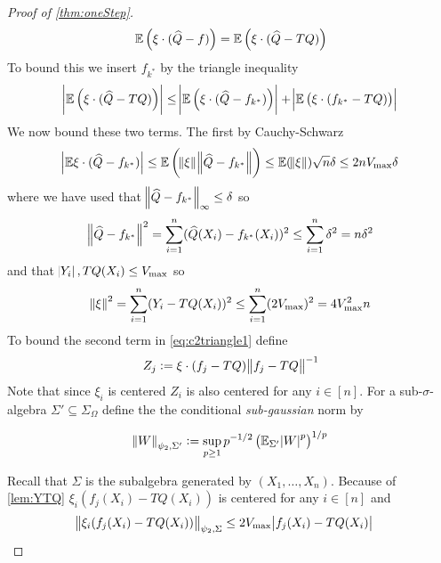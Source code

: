 \begin{proof}[Proof of \cref{thm:oneStep}]
  \begin{equation}
    \mathbb{E} \left( \xi \cdot (\widehat{Q} - f) \right)
    = \mathbb{E} \left( \xi \cdot (\widehat{Q} - TQ) \right)
  \end{equation}
  To bound this we insert $f_{k^*}$ by the triangle inequality
  \begin{equation}
    \abs{\mathbb{E} \left( \xi \cdot (\widehat{Q} - TQ) \right) }
    \leq \abs{\mathbb{E} \left( \xi \cdot (\widehat{Q} - f_{k^*}) \right) } 
    + \abs{\mathbb{E} \left( \xi \cdot (f_{k^*} - TQ) \right) }
    \label{eq:c2triangle1}
  \end{equation}
  We now bound these two terms. The first by Cauchy-Schwarz
  \begin{equation}
    \abs{\mathbb{E} \xi \cdot (\widehat{Q} - f_{k^*})}
    \leq \mathbb{E} \left( \norm{\xi} \norm{\widehat{Q} - f_{k^*}} \right)
    \leq \mathbb{E} (\norm{\xi}) \sqrt{n} \delta
    \leq 2 n V_{\max} \delta
    \label{eq:c2firstcs}
  \end{equation}
  where we have used that $\norm{\widehat{Q} - f_{k^*}}_\infty \leq \delta$ so
  \begin{equation}
    \norm{\widehat{Q} - f_{k^*}}^2
    = \sum_{i=1}^n (\widehat{Q}(X_i) - f_{k^*}(X_i))^2
    \leq \sum_{i=1}^n \delta^2
    = n \delta^2
  \end{equation}
  and that $\abs{Y_i}, TQ(X_i) \leq V_{\max}$ so
  \begin{equation}
    \norm{\xi}^2 = \sum_{i=1}^n (Y_i - TQ(X_i))^2 
    \leq \sum_{i=1}^n (2 V_{\max})^2
    = 4 V_{\max}^2 n
  \end{equation}
  To bound the second term in \cref{eq:c2triangle1} define
  \begin{equation}
  Z_j := \xi \cdot (f_j - TQ) \norm{f_j - TQ}^{-1}
  \end{equation}
  Note that since $\xi_i$ is centered $Z_i$ is also centered for any
  $i \in [n]$.
  For a sub-$\sigma$-algebra $\Sigma' \subseteq \Sigma_\Omega$
  define the the conditional
  \emph{sub-gaussian} norm by
  \begin{defn}
    \[ \norm{W}_{\psi_2,\Sigma'} \vcentcolon=
    \sup_{p\geq 1} p^{-1/2} \left( \mathbb{E}_{\Sigma'} \abs{W}^p \right)^{1/p} \]
  \end{defn}
  Recall that $\Sigma$ is the subalgebra generated by $(X_1, \dots, X_n)$.
  Because of \cref{lem:YTQ} $\xi_i (f_j(X_i) - TQ(X_i))$ is centered for any
  $i \in [n]$ and
  \begin{align}
    \norm{\xi_i(f_j(X_i) - TQ(X_i))}_{\psi_2, \Sigma}
    \leq &\; 2 V_{\max} \abs{f_j(X_i) - TQ(X_i)}
  \end{align}

\end{proof}
